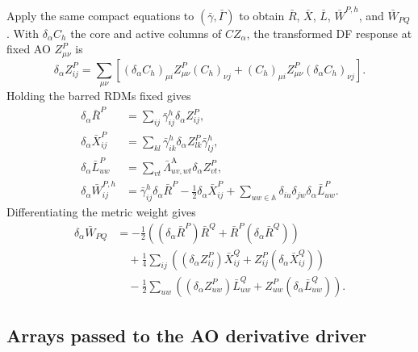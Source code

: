 \documentclass[aip,preprint,nofootinbib]{revtex4-1}
\newcommand{\act}{\mathrm{A}}
\begin{document}
Apply the same compact equations to $(\bar\gamma,\bar\Gamma)$ to obtain
$\bar R$, $\bar X$, $\bar L$, $\bar W^{P,h}$, and $\bar W_{PQ}$.  With
$\delta_\alpha C_h$ the core and active columns of $CZ_\alpha$, the transformed
DF response at fixed AO $Z^P_{\mu\nu}$ is
\begin{equation}
 \delta_\alpha Z^P_{ij}
 =\sum_{\mu\nu}\left[
 (\delta_\alpha C_h)_{\mu i}Z^P_{\mu\nu}(C_h)_{\nu j}
 +(C_h)_{\mu i}Z^P_{\mu\nu}(\delta_\alpha C_h)_{\nu j}
 \right].
 \label{eq:nr-hole-df-response}
\end{equation}
Holding the barred RDMs fixed gives
\begin{align}
 \delta_\alpha\bar R^{P}
 &=\sum_{ij}\bar\gamma^h_{ij}\delta_\alpha Z^P_{ij},
 \\
 \delta_\alpha\bar X^{P}_{ij}
 &=\sum_{kl}\bar\gamma^h_{ik}\delta_\alpha Z^P_{lk}\bar\gamma^h_{lj},
 \\
 \delta_\alpha\bar L^{P}_{uw}
 &=\sum_{vt}\bar\Lambda^{\act}_{uv,wt}\delta_\alpha Z^P_{vt},
 \\
 \delta_\alpha\bar W^{P,h}_{ij}
 &=\bar\gamma^h_{ij}\delta_\alpha\bar R^{P}
 -\frac12\delta_\alpha\bar X^{P}_{ij}
 +\sum_{uw\in\mathbb A}\delta_{iu}\delta_{jw}
  \delta_\alpha\bar L^{P}_{uw}.
 \label{eq:nr-directional-w3}
\end{align}
Differentiating the metric weight gives
\begin{align}
 \delta_\alpha\bar W_{PQ}
 &=-\frac12\left((\delta_\alpha\bar R^{P})\bar R^Q
                  +\bar R^P(\delta_\alpha\bar R^{Q})\right)
 \nonumber\\
 &\quad+\frac14\sum_{ij}\left(
 (\delta_\alpha Z^P_{ij})\bar X^Q_{ij}
 +Z^P_{ij}(\delta_\alpha\bar X^Q_{ij})\right)
 \nonumber\\
 &\quad-\frac12\sum_{uw}\left(
 (\delta_\alpha Z^P_{uw})\bar L^Q_{uw}
 +Z^P_{uw}(\delta_\alpha\bar L^Q_{uw})\right).
 \label{eq:nr-directional-w2}
\end{align}

\subsection{Arrays passed to the AO derivative driver}
\end{document}
